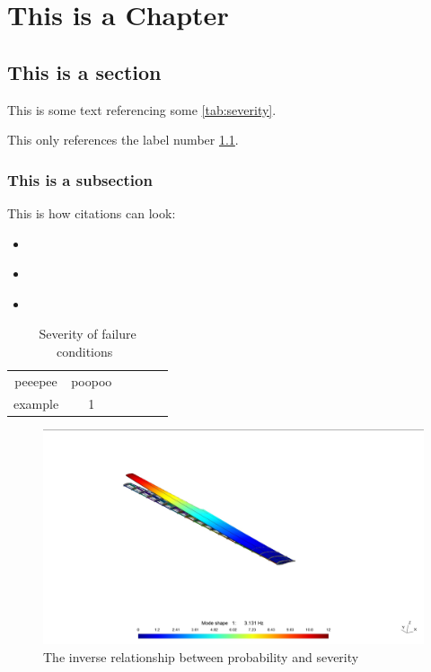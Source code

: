 
\chapter{This is a Chapter}
\label{ch:Intro}

\section{This is a section}
This is some text referencing some \autoref{tab:severity}.

This only references the label number \ref{tab:severity}.



\subsection{This is a subsection}
\label{aLabel}
This is how citations can look: 
\begin{itemize}
\item \cite{Koeltzsch}\\
\item \parencite{Koeltzsch}\\
\item \textcite{Koeltzsch}\\
\end{itemize}









\begin{table}[h]
    \centering
    \caption{Severity of failure conditions~\cite[p. 779]{CS-25}}
    \begin{tabular}{c|ccccc}
        \toprule
         peeepee & poopoo \\
         example & 1 \\
    \end{tabular}
    \label{tab:severity}
\end{table}


\begin{figure}[h]
    \centering
    \includegraphics[width=.5\textwidth]{figures/mode1.jpg}
    \caption{The inverse relationship between probability and severity~\cite{CS-25}}
    \label{fig:inverseRelationship}
\end{figure}




